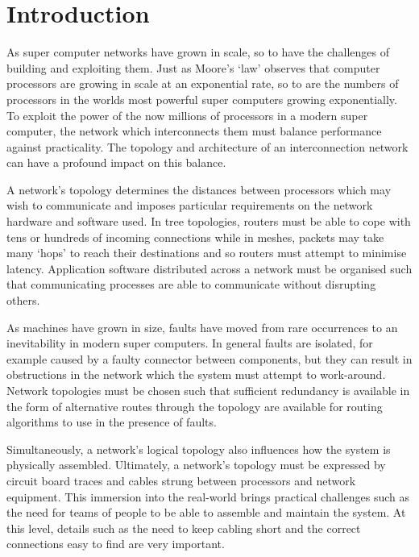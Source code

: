 \chapter{Introduction}

%

As super computer networks have grown in scale, so to have the challenges of
building and exploiting them. Just as Moore's `law' observes that computer
processors are growing in scale at an exponential rate, so to are the numbers
of processors in the worlds most powerful super computers growing
exponentially. To exploit the power of the now millions of processors in a
modern super computer, the network which interconnects them must balance
performance against practicality. The topology and architecture of an
interconnection network can have a profound impact on this balance.

A network's topology determines the distances between processors which may wish
to communicate and imposes particular requirements on the network hardware and
software used. In tree topologies, routers must be able to cope with tens or
hundreds of incoming connections while in meshes, packets may take many `hops'
to reach their destinations and so routers must attempt to minimise latency.
Application software distributed across a network must be organised such that
communicating processes are able to communicate without disrupting others.

As machines have grown in size, faults have moved from rare occurrences to an
inevitability in modern super computers. In general faults are isolated, for
example caused by a faulty connector between components, but they can result in
obstructions in the network which the system must attempt to work-around.
Network topologies must be chosen such that sufficient redundancy is available
in the form of alternative routes through the topology are available for
routing algorithms to use in the presence of faults.

Simultaneously, a network's logical topology also influences how the system is
physically assembled. Ultimately, a network's topology must be expressed by
circuit board traces and cables strung between processors and network
equipment. This immersion into the real-world brings practical challenges such
as the need for teams of people to be able to assemble and maintain the system.
At this level, details such as the need to keep cabling short and the correct
connections easy to find are very important.

